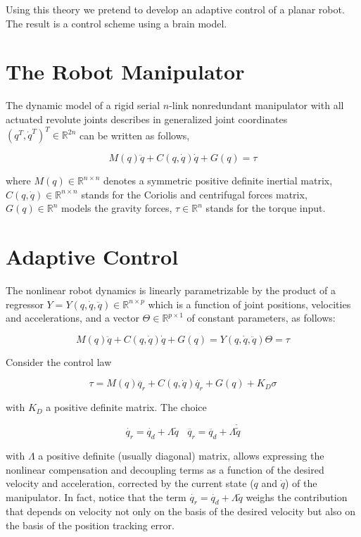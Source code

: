 Using this theory we pretend to develop an adaptive control of a planar robot. The result is a control scheme using a brain model.
\section{The Robot Manipulator}
The dynamic model of a rigid serial $n$-link nonredundant manipulator with all actuated revolute joints describes in generalized joint coordinates $(q^T,\dot{q}^T)^T\in\mathbb{R}^{2n}$ can be written as follows,

\begin{equation}
M(q)\ddot{q}+C(q,\dot{q})\dot{q}+G(q)=\tau\label{din}
\end{equation}

where $M(q)\in\mathbb{R}^{n\times n}$ denotes a symmetric positive definite inertial matrix, $C(q,\dot{q})\in\mathbb{R}^{n\times n}$ stands for the Coriolis and centrifugal forces matrix, $G(q)\in\mathbb{R}^n$ models the gravity forces, $\tau\in\mathbb{R}^n$ stands for the torque input.

\section{Adaptive Control}
The nonlinear robot dynamics is linearly parametrizable \citep{Slotine} by the product of a regressor $Y=Y(q,\dot{q},\ddot{q})\in\mathbb{R}^{n\times p}$ which is a function of joint positions, velocities and accelerations, and a vector $\Theta\in\mathbb{R}^{p\times1}$ of constant parameters, as follows:

\begin{equation}
M(q)\ddot{q}+C(q,\dot{q})\dot{q}+G(q)=Y(q,\dot{q},\ddot{q})\Theta=\tau\label{din2}
\end{equation}

Consider the control law \citep{Adapt}

\begin{equation}
\tau=M(q)\ddot{q_r}+C(q,\dot{q})\dot{q_r}+G(q)+K_D\sigma\label{mal}
\end{equation}

with $K_D$ a positive definite matrix. The choice

\begin{equation}
\dot{q_r}=\dot{q_d}+\Lambda \tilde{q} \ \ \ \ \ddot{q_r}=\ddot{q_d}+\Lambda \dot{\tilde{q}}
\end{equation}

with $\Lambda$ a positive definite (usually diagonal) matrix, allows expressing the nonlinear compensation and decoupling terms as a function of the desired velocity and acceleration, corrected by the current state ($q$ and $\dot{q}$) of the manipulator. In fact, notice that the term $\dot{q_r}=\dot{q_d}+\Lambda \tilde{q}$ weighs the contribution that depends on velocity not only on the basis of the desired velocity but also on the basis of the position tracking error.\\

